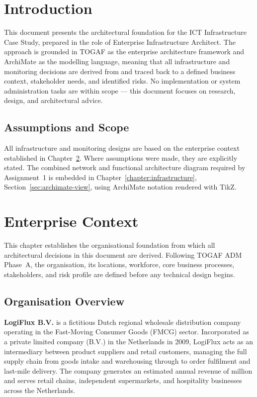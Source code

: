 \chapter{Introduction}
\label{chapter:introduction}

This document presents the architectural foundation for the ICT Infrastructure Case Study, prepared in the role of Enterprise Infrastructure Architect. The approach is grounded in TOGAF as the enterprise architecture framework and ArchiMate as the modelling language, meaning that all infrastructure and monitoring decisions are derived from and traced back to a defined business context, stakeholder needs, and identified risks. No implementation or system administration tasks are within scope --- this document focuses on research, design, and architectural advice.

\section{Assumptions and Scope}

All infrastructure and monitoring designs are based on the enterprise context established in Chapter~\ref{chapter:enterprise-context}. Where assumptions were made, they are explicitly stated. The combined network and functional architecture diagram required by Assignment~1 is embedded in Chapter~\ref{chapter:infrastructure}, Section~\ref{sec:archimate-view}, using ArchiMate notation rendered with TikZ.

\chapter{Enterprise Context}
\label{chapter:enterprise-context}

This chapter establishes the organisational foundation from which all architectural decisions in this document are derived. Following TOGAF ADM Phase~A, the organisation, its locations, workforce, core business processes, stakeholders, and risk profile are defined before any technical design begins.

\section{Organisation Overview}

\textbf{LogiFlux B.V.} is a fictitious Dutch regional wholesale distribution company operating in the Fast-Moving Consumer Goods (FMCG) sector. Incorporated as a private limited company (B.V.) in the Netherlands in 2009, LogiFlux acts as an intermediary between product suppliers and retail customers, managing the full supply chain from goods intake and warehousing through to order fulfilment and last-mile delivery. The company generates an estimated annual revenue of  million and serves retail chains, independent supermarkets, and hospitality businesses across the Netherlands.

